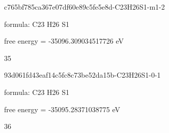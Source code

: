 \documentclass{article}
\begin{document}
\vspace{1cm}


c765bf785ca367e07df60e89c5fe5e8d-C23H26S1-m1-2



formula: C23 H26 S1



free energy = -35096.309034517726 eV

35

\vspace{1cm}


93d061fd43eaf14c5fc8c73be52da15b-C23H26S1-0-1



formula: C23 H26 S1



free energy = -35095.28371038775 eV

36
\end{document}
